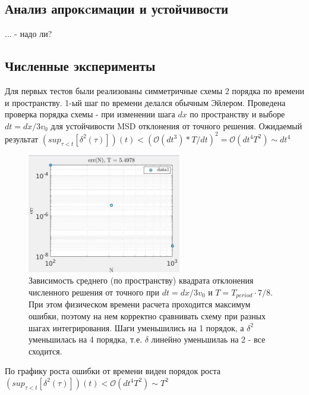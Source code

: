 \documentclass[a4paper,12pt]{article} %
\begin{document}
\subsection{Анализ апрокcимации и устойчивости}
... - надо ли?

\subsection{Численные эксперименты}

Для первых тестов были реализованы симметричные схемы 2 порядка по времени и пространству. 1-ый шаг по времени делался обычным Эйлером. Проведена проверка порядка схемы - при изменении шага $dx$ по пространству и выборе $dt = dx/3v_0$ для устойчивости MSD отклонения от точного решения. Ожидаемый результат $(sup_{\tau < t}[\delta^2(\tau)])(t) < (\mathcal{O}(dt^3) * T/dt)^2 = \mathcal{O}(dt^4 T^2) \sim dt^4$

\begin{figure}[h!]
\begin{center}
\includegraphics[width=0.6\textwidth]{./pics/Atype_nErr}
\end{center}
\caption{Зависимость среднего (по пространству) квадрата отклонения численного решения от точного при $dt = dx/3v_0$ и $T = T_{period} \cdot 7/8$. При этом физическом времени расчета проходится максимум ошибки, поэтому на нем корректно сравнивать схему при разных шагах интегрирования. Шаги уменьшились на 1 порядок, а $\delta^2$ уменьшилась на 4 порядка, т.е. $\delta$ линейно уменьшилаь на 2 - все сходится.} \label{img:Atype_nErr}
\end{figure}

\newpage

По графику роста ошибки от времени виден порядок роста $(sup_{\tau < t}[\delta^2(\tau)])(t) < \mathcal{O}(dt^4 T^2) \sim T^2$
\end{document}
